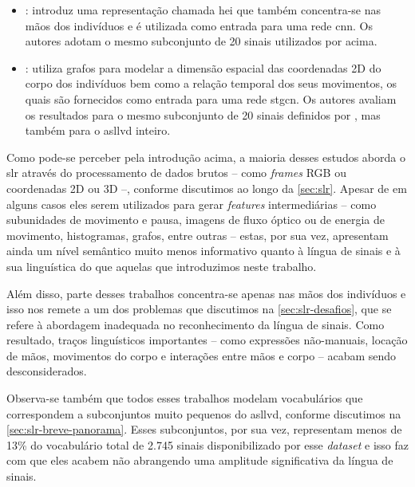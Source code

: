 \begin{itemize}
      \item \textbf{}: introduz uma representação chamada \acrfull{hei} que também concentra-se nas mãos dos indivíduos e é utilizada como entrada para uma rede \acrfull{cnn}.
            Os autores adotam o mesmo subconjunto de 20 sinais utilizados por  acima.

      \item \textbf{}: utiliza grafos para modelar a dimensão espacial das coordenadas 2D do corpo dos indivíduos bem como a relação temporal dos seus movimentos, os quais são fornecidos como entrada para uma rede \acrfull{stgcn}.
            Os autores avaliam os resultados para o mesmo subconjunto de 20 sinais definidos por , mas também para o \acrshort{asllvd} inteiro.
\end{itemize}


Como pode-se perceber pela introdução acima, a maioria desses estudos aborda o \acrshort{slr} através do processamento de dados brutos -- como \textit{frames} RGB ou coordenadas 2D ou 3D --, conforme discutimos ao longo da \autoref{sec:slr}.
Apesar de em alguns casos eles serem utilizados para gerar \textit{features} intermediárias -- como subunidades de movimento e pausa, imagens de fluxo óptico ou de energia de movimento, histogramas, grafos, entre outras -- estas, por sua vez, apresentam ainda um nível semântico muito menos informativo quanto à língua de sinais e à sua linguística do que aquelas que introduzimos neste trabalho.

Além disso, parte desses trabalhos concentra-se apenas nas mãos dos indivíduos e isso nos remete a um dos problemas que discutimos na \autoref{sec:slr-desafios}, que se refere à abordagem inadequada no reconhecimento da língua de sinais. Como resultado, traços linguísticos importantes -- como expressões não-manuais, locação de mãos, movimentos do corpo e interações entre mãos e corpo -- acabam sendo desconsiderados.

Observa-se também que todos esses trabalhos modelam vocabulários que correspondem a subconjuntos muito pequenos do \acrshort{asllvd}, conforme discutimos na \autoref{sec:slr-breve-panorama}.
Esses subconjuntos, por sua vez, representam menos de 13\% do vocabulário total de 2.745 sinais disponibilizado por esse \textit{dataset} e isso faz com que eles acabem não abrangendo uma amplitude significativa da língua de sinais.

